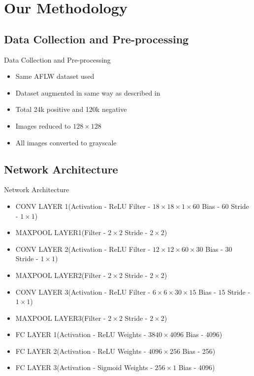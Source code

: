 \documentclass{beamer}
\begin{document}
\section{Our Methodology}
\subsection{Data Collection and Pre-processing}
\begin{frame}{Data Collection and Pre-processing}
  \begin{itemize}
      \item Same AFLW dataset used
      \item Dataset augmented in same way as described in \cite{paper}
      \item Total 24k positive and 120k negative
      \item Images reduced to $128\times128$
      \item All images converted to grayscale
  \end{itemize}
\end{frame}
\subsection{Network Architecture}
\begin{frame}{Network Architecture}
  \begin{itemize}
    \item CONV LAYER 1(Activation - ReLU Filter - $18\times18\times1\times60$ Bias - $60$ Stride - $1\times1$)
    \item MAXPOOL LAYER1(Filter - $2\times2$ Stride - $2\times2$)
    \item CONV LAYER 2(Activation - ReLU Filter - $12\times12\times60\times30$ Bias - $30$ Stride - $1\times1$)
    \item MAXPOOL LAYER2(Filter - $2\times2$ Stride - $2\times2$)
    \item CONV LAYER 3(Activation - ReLU Filter - $6\times6\times30\times15$ Bias - $15$ Stride - $1\times1$)
    \item MAXPOOL LAYER3(Filter - $2\times2$ Stride - $2\times2$)
    \item FC LAYER 1(Activation - ReLU Weights - $3840\times4096$ Bias - 4096)
    \item FC LAYER 2(Activation - ReLU Weights - $4096\times256$ Bias - 256)
    \item FC LAYER 3(Activation - Sigmoid Weights - $256\times1$ Bias - 4096)
  \end{itemize}
\end{frame}
\end{document}
